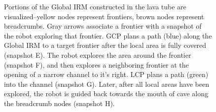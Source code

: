 \documentclass[letterpaper]{article} %
\begin{document}
\begin{figure}[h!]
\centering
\caption{Portions of the Global IRM constructed in the lava tube are visualized--yellow nodes represent frontiers, brown nodes represent breadcrumbs. Gray arrows associate a frontier with a snapshot of the robot exploring that frontier. GCP plans a path (blue) along the Global IRM to a target frontier after the local area is fully covered (snapshot E). The robot explores the area around the frontier (snapshot F), and then explores a neighboring frontier at the opening of a narrow channel to it's right. LCP plans a path (green) into the channel (snapshot G). Later, after all local areas have been explored, the robot is guided back towards the mouth of cave along the breadcrumb nodes (snapshot H).} \label{fig:glp_hardware_tests} 
\end{figure}
\end{document}

